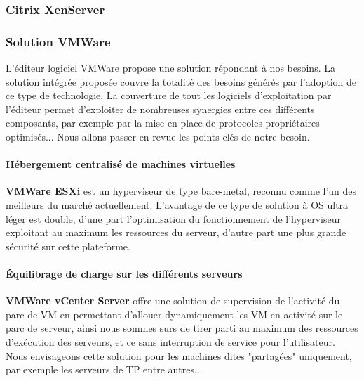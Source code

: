 \subsubsection{Citrix XenServer}

\subsubsection{Solution VMWare}

L'éditeur logiciel VMWare propose une solution répondant à nos besoins. La solution intégrée proposée couvre la totalité des besoins générés par l'adoption de ce type de technologie. La couverture de tout les logiciels d'exploitation par l'éditeur permet d'exploiter de nombreuses synergies entre ces différents composants, par exemple par la mise en place de protocoles propriétaires optimisés... Nous allons passer en revue les points clés de notre besoin.\\

\paragraph{Hébergement centralisé de machines virtuelles}

\textbf{VMWare ESXi} est un hyperviseur de type bare-metal, reconnu comme l'un des meilleurs du marché actuellement. L'avantage de ce type de solution à OS ultra léger est double, d'une part l'optimisation du fonctionnement de l'hyperviseur exploitant au maximum les ressources du serveur, d'autre part une plus grande sécurité sur cette plateforme.

\paragraph{Équilibrage de charge sur les différents serveurs}

\textbf{VMWare vCenter Server} offre une solution de supervision de l'activité du parc de VM en permettant d'allouer dynamiquement les VM en activité sur le parc de serveur, ainsi nous sommes surs de tirer parti au maximum des ressources d'exécution des serveurs, et ce sans interruption de service pour l'utilisateur. Nous envisageons cette solution pour les machines dites "partagées" uniquement, par exemple les serveurs de TP entre autres...


